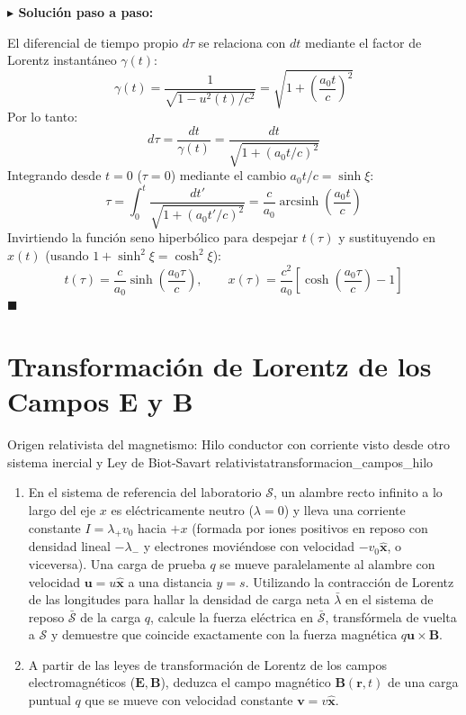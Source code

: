 \documentclass[11pt,a4paper]{book}
\newenvironment{solucion}{%
    \par\medskip\noindent\textbf{\color{blue!65!black}\Large $\blacktriangleright$ Solución paso a paso:}\par\medskip
}{%
    \hfill$\blacksquare$\par\bigskip
}
\newcommand{\xhat}{\hat{\bm{x}}}
\newcommand{\Evec}{\bm{E}}
\newcommand{\Bvec}{\bm{B}}
\begin{document}
\begin{solucion}
El diferencial de tiempo propio $d\tau$ se relaciona con $dt$ mediante el factor de Lorentz instantáneo $\gamma(t)$:
\begin{equation}
    \gamma(t) = \frac{1}{\sqrt{1 - u^2(t)/c^2}} = \sqrt{1 + \left(\frac{a_0 t}{c}\right)^2}
\end{equation}
Por lo tanto:
\begin{equation}
    d\tau = \frac{dt}{\gamma(t)} = \frac{dt}{\sqrt{1 + (a_0 t / c)^2}}
\end{equation}
Integrando desde $t=0$ ($\tau = 0$) mediante el cambio $a_0 t / c = \sinh\xi$:
\begin{equation}
    \tau = \int_{0}^{t} \frac{dt'}{\sqrt{1 + (a_0 t' / c)^2}} = \frac{c}{a_0} \operatorname{arcsinh}\left(\frac{a_0 t}{c}\right)
\end{equation}
Invirtiendo la función seno hiperbólico para despejar $t(\tau)$ y sustituyendo en $x(t)$ (usando $1 + \sinh^2\xi = \cosh^2\xi$):
\begin{equation}
    t(\tau) = \frac{c}{a_0} \sinh\left(\frac{a_0 \tau}{c}\right), \qquad x(\tau) = \frac{c^2}{a_0} \left[ \cosh\left(\frac{a_0 \tau}{c}\right) - 1 \right]
\end{equation}
\end{solucion}

\section{Transformación de Lorentz de los Campos \texorpdfstring{$\Evec$}{E} y \texorpdfstring{$\Bvec$}{B}}

\begin{ejercicio}{Origen relativista del magnetismo: Hilo conductor con corriente visto desde otro sistema inercial y Ley de Biot-Savart relativista}{transformacion_campos_hilo}
\begin{enumerate}[label=\alph*)]
    \item En el sistema de referencia del laboratorio $\mathcal{S}$, un alambre recto infinito a lo largo del eje $x$ es eléctricamente neutro ($\lambda = 0$) y lleva una corriente constante $I = \lambda_+ v_0$ hacia $+x$ (formada por iones positivos en reposo con densidad lineal $-\lambda_-$ y electrones moviéndose con velocidad $-v_0\xhat$, o viceversa). Una carga de prueba $q$ se mueve paralelamente al alambre con velocidad $\bm{u} = u\xhat$ a una distancia $y = s$. Utilizando la contracción de Lorentz de las longitudes para hallar la densidad de carga neta $\bar{\lambda}$ en el sistema de reposo $\bar{\mathcal{S}}$ de la carga $q$, calcule la fuerza eléctrica en $\bar{\mathcal{S}}$, transfórmela de vuelta a $\mathcal{S}$ y demuestre que coincide exactamente con la fuerza magnética $q\bm{u}\times\Bvec$.
    \item A partir de las leyes de transformación de Lorentz de los campos electromagnéticos ($\Evec, \Bvec$), deduzca el campo magnético $\Bvec(\bm{r},t)$ de una carga puntual $q$ que se mueve con velocidad constante $\bm{v} = v\xhat$.
\end{enumerate}
\end{ejercicio}
\end{document}
